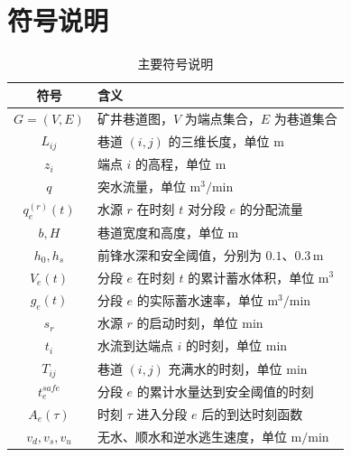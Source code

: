 \section{符号说明}

\begin{table}[H]
  \centering
  \caption{主要符号说明}
  \begin{tabular}{cl}
    \toprule
    符号 & 含义 \\
    \midrule
    $G=(V,E)$ & 矿井巷道图，$V$ 为端点集合，$E$ 为巷道集合 \\
    $L_{ij}$ & 巷道 $(i,j)$ 的三维长度，单位 m \\
    $z_i$ & 端点 $i$ 的高程，单位 m \\
    $q$ & 突水流量，单位 $\mathrm{m^3/min}$ \\
    $q_e^{(r)}(t)$ & 水源 $r$ 在时刻 $t$ 对分段 $e$ 的分配流量 \\
    $b,H$ & 巷道宽度和高度，单位 m \\
    $h_0,h_s$ & 前锋水深和安全阈值，分别为 $0.1$、$0.3\,\mathrm{m}$ \\
    $V_e(t)$ & 分段 $e$ 在时刻 $t$ 的累计蓄水体积，单位 $\mathrm{m^3}$ \\
    $g_e(t)$ & 分段 $e$ 的实际蓄水速率，单位 $\mathrm{m^3/min}$ \\
    $s_r$ & 水源 $r$ 的启动时刻，单位 min \\
    $t_i$ & 水流到达端点 $i$ 的时刻，单位 min \\
    $T_{ij}$ & 巷道 $(i,j)$ 充满水的时刻，单位 min \\
    $t^{safe}_{e}$ & 分段 $e$ 的累计水量达到安全阈值的时刻 \\
    $A_e(\tau)$ & 时刻 $\tau$ 进入分段 $e$ 后的到达时刻函数 \\
    $v_d,v_s,v_u$ & 无水、顺水和逆水逃生速度，单位 $\mathrm{m/min}$ \\
    \bottomrule
  \end{tabular}
\end{table}
